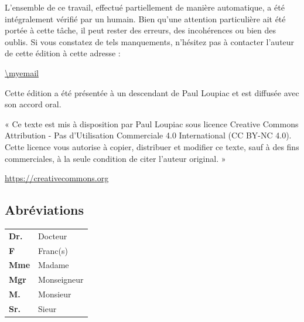 L’ensemble de ce travail, effectué partiellement de manière automatique, a été intégralement vérifié par un humain. Bien qu'une attention particulière ait été portée à cette tâche, il peut rester des erreurs, des incohérences ou bien des oublis. Si vous constatez de tels manquements, n’hésitez pas à contacter l'auteur de cette édition à cette adresse :

\begin{center}
    \url{\myemail}
\end{center}

Cette édition a été présentée à un descendant de Paul Loupiac et est diffusée avec son accord oral.

« Ce texte est mis à disposition par Paul Loupiac sous licence Creative Commons Attribution - Pas d'Utilisation Commerciale 4.0 International (CC BY-NC 4.0). Cette licence vous autorise à copier, distribuer et modifier ce texte, sauf à des fins commerciales, à la seule condition de citer l'auteur original. »

\begin{flushright}
    \url{https://creativecommons.org}
\end{flushright}

\subsection{Abréviations}

\noindent
\hspace*{1cm}
\begin{tabular}{ l l }
 \textbf{Dr.} & Docteur \\ 
 \textbf{F} & Franc(s) \\  
 \textbf{Mme} & Madame \\  
 \textbf{Mgr} & Monseigneur \\  
 \textbf{M.} & Monsieur \\  
 \textbf{Sr.} & Sieur     
\end{tabular}


